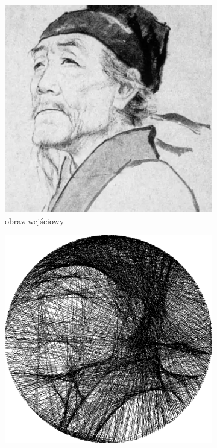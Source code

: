 	\begin{figure}[H] 
    \centering
    \begin{subfigure}{0.24\textwidth}
        \centering
        \includegraphics[width = \textwidth]{img/6-comp/dufu_original_c10_inv0.png}
        \caption{obraz wejściowy}
        \label{comp-comp-dufu-gogh-a}
    \end{subfigure}
    \begin{subfigure}{0.24\textwidth}
        \centering
        \includegraphics[width = \textwidth]{img/6-comp/dufu_xiaonan_.png}

\end{subfigure}
\end{figure}
